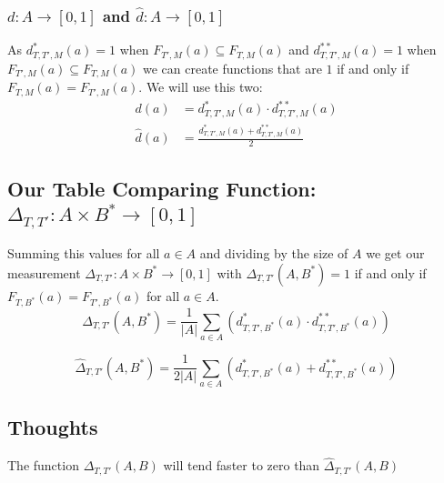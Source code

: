 \subsubsection{$d : A \to [0,1]$ and $\hat{d} : A \to [0,1]$}

As $d^*_{T,T',M}(a) = 1$ when $F_{T', M}(a) \subseteq F_{T, M}(a)$ and $d^{**}_{T,T',M}(a) = 1$ when $F_{T', M}(a) \subseteq F_{T, M}(a)$ we can create functions that are $1$ if and only if $F_{T, M}(a) = F_{T', M}(a)$.
We will use this two:
\[
\begin{array}{ll}
  d(a) & = d^*_{T,T',M}(a) \cdot d^{**}_{T,T',M}(a)
  \\[1em]
  \hat{d}(a) & = \frac{d^*_{T,T',M}(a) + d^{**}_{T,T',M}(a)}{2}
\end{array}
\]

\subsection{Our Table Comparing Function: $\Delta_{T,T'} : A \times B^* \to [0,1]$}

Summing this values for all $a \in A$ and dividing by the size of $A$ we get our measurement \mbox{$\Delta_{T,T'} : A \times B^* \to [0,1]$}
with $\Delta_{T,T'}(A, B^*) = 1$ if and only if $F_{T, B^*}(a) = F_{T', B^*}(a)$ for all $a \in A$.
\begin{equation}
  \Delta_{T,T'}(A, B^*) = 
    \frac{1}{|A|} 
    \sum_{a \in A} (d^*_{T,T',B^*}(a) \cdot d^{**}_{T,T',B^*}(a))
\end{equation}

% 
\begin{equation}
  \hat{\Delta}_{T,T'}(A, B^*) = 
    \frac{1}{2 |A|} 
    \sum_{a \in A} (d^*_{T,T',B^*}(a) + d^{**}_{T,T',B^*}(a))
\end{equation}
 
 



\subsection{Thoughts}
The function $\Delta_{T,T'}(A, B)$ will tend faster to zero than $\hat{\Delta}_{T,T'}(A, B)$


